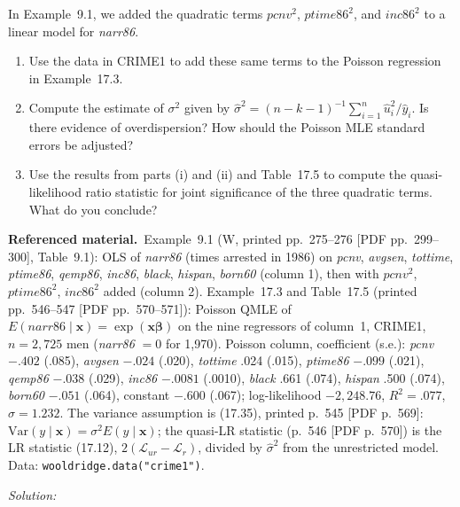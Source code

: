 \documentclass[11pt,a4paper]{article}
\newif\ifsolucoes
\newcommand{\espacoresol}{3.5cm}   %
\numberwithin{equation}{questao}   %
\newenvironment{refmat}{\par\smallskip\noindent\begin{small}\textbf{Referenced material.}\ }{\end{small}\par\smallskip}
\newcommand{\resolespaco}{\ifsolucoes\else\par\textit{Solution:}\vspace{\espacoresol}\par\fi}
\begin{document}
In Example~9.1, we added the quadratic terms $\textit{pcnv}^2$, $\textit{ptime86}^2$, and
$\textit{inc86}^2$ to a linear model for \textit{narr86}.
\begin{enumerate}[label=(\roman*)]
\item Use the data in CRIME1 to add these same terms to the Poisson regression in Example~17.3.
\item Compute the estimate of $\sigma^2$ given by $\hat\sigma^2=(n-k-1)^{-1}\sum_{i=1}^n\hat u_i^2/\hat y_i$.
Is there evidence of overdispersion? How should the Poisson MLE standard errors be adjusted?
\item Use the results from parts (i) and (ii) and Table~17.5 to compute the quasi-likelihood ratio
statistic for joint significance of the three quadratic terms. What do you conclude?
\end{enumerate}
\begin{refmat}Example~9.1 (W, printed pp.~275--276 [PDF pp.~299--300], Table~9.1): OLS of
\textit{narr86} (times arrested in 1986) on \textit{pcnv}, \textit{avgsen}, \textit{tottime},
\textit{ptime86}, \textit{qemp86}, \textit{inc86}, \textit{black}, \textit{hispan}, \textit{born60}
(column 1), then with $\textit{pcnv}^2$, $\textit{ptime86}^2$, $\textit{inc86}^2$ added (column 2).
Example~17.3 and Table~17.5 (printed pp.~546--547 [PDF pp.~570--571]): Poisson QMLE of
$E(\textit{narr86}\mid\mathbf x)=\exp(\mathbf x\boldsymbol\beta)$ on the nine regressors of column~1,
CRIME1, $n=2{,}725$ men (\textit{narr86} $=0$ for 1,970). Poisson column, coefficient (s.e.):
\textit{pcnv} $-.402$ (.085), \textit{avgsen} $-.024$ (.020), \textit{tottime} .024 (.015),
\textit{ptime86} $-.099$ (.021), \textit{qemp86} $-.038$ (.029), \textit{inc86} $-.0081$ (.0010),
\textit{black} .661 (.074), \textit{hispan} .500 (.074), \textit{born60} $-.051$ (.064), constant
$-.600$ (.067); log-likelihood $-2{,}248.76$, $R^2=.077$, $\hat\sigma=1.232$. The variance assumption
is (17.35), printed p.~545 [PDF p.~569]: $\mathrm{Var}(y\mid\mathbf x)=\sigma^2E(y\mid\mathbf x)$; the
quasi-LR statistic (p.~546 [PDF p.~570]) is the LR statistic (17.12), $2(\mathcal L_{ur}-\mathcal L_r)$,
divided by $\hat\sigma^2$ from the unrestricted model. Data: \texttt{wooldridge.data("crime1")}.\end{refmat}
\resolespaco
\end{document}
